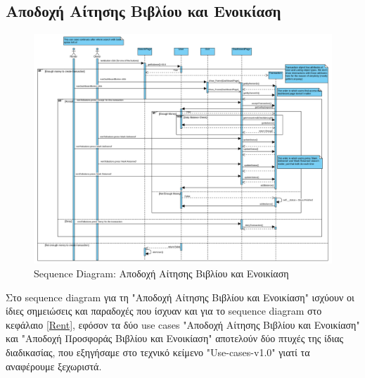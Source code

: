 \documentclass[12pt,a4paper]{article}
\begin{document}
\subsection{Αποδοχή Αίτησης Βιβλίου και Ενοικίαση}
\begin{figure}[H]
	\includegraphics[width=\textwidth]{Accept Request Offer and Rent Sequence.png}
	\caption{Sequence Diagram: Αποδοχή Αίτησης Βιβλίου και Ενοικίαση}
	\label{Sequence Diagram: Αποδοχή Αίτησης Βιβλίου και Ενοικίαση}
\end{figure}

Στο sequence diagram για τη "Αποδοχή Αίτησης Βιβλίου και Ενοικίαση" ισχύουν οι ίδιες σημειώσεις και παραδοχές που ίσχυαν και για το sequence diagram στο κεφάλαιο \ref{Rent}, εφόσον τα δύο use cases "Αποδοχή Αίτησης Βιβλίου και Ενοικίαση" και "Αποδοχή Προσφοράς Βιβλίου και Ενοικίαση" αποτελούν δύο πτυχές της ίδιας διαδικασίας, που εξηγήσαμε στο τεχνικό κείμενο "Use-cases-v1.0" γιατί τα αναφέρουμε ξεχωριστά.
\end{document}
